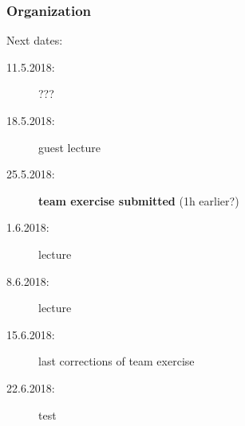 


\date{4.5.2018}



\renewcommand{\enquote}[1]{\emph{``#1''}} %

\begin{frame}
	\titlepage
	\doclicenseThis
\end{frame}

\begin{frame}
	\frametitle{Organization}
	Next dates:
	\begin{description}
		\item[11.5.2018:] ???
		\item[18.5.2018:] guest lecture
		\item[25.5.2018:] \textbf{team exercise submitted} (1h earlier?)
		\item[1.6.2018:] lecture
		\item[8.6.2018:] lecture
		\item[15.6.2018:] last corrections of team exercise
		\item[22.6.2018:] test
	\end{description}
\end{frame}


